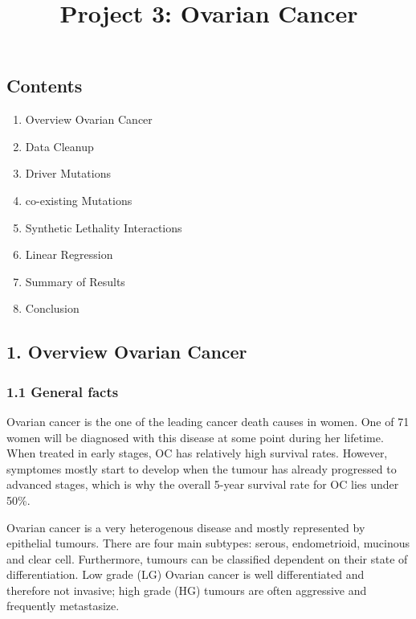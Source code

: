 \documentclass[]{article}
\title{Project 3: Ovarian Cancer}
\author{}
\date{}
\providecommand{\tightlist}{%
  \setlength{\itemsep}{0pt}\setlength{\parskip}{0pt}}
\begin{document}
\maketitle

\hypertarget{contents}{%
\subsection{Contents}\label{contents}}

\begin{enumerate}
\def\labelenumi{\arabic{enumi}.}
\tightlist
\item
  Overview Ovarian Cancer
\item
  Data Cleanup
\item
  Driver Mutations
\item
  co-existing Mutations
\item
  Synthetic Lethality Interactions
\item
  Linear Regression
\item
  Summary of Results
\item
  Conclusion
\end{enumerate}

\hypertarget{overview-ovarian-cancer}{%
\subsection{1. Overview Ovarian Cancer}\label{overview-ovarian-cancer}}

\hypertarget{general-facts}{%
\subsubsection{1.1 General facts}\label{general-facts}}

Ovarian cancer is the one of the leading cancer death causes in women.
One of 71 women will be diagnosed with this disease at some point during
her lifetime. When treated in early stages, OC has relatively high
survival rates. However, symptomes mostly start to develop when the
tumour has already progressed to advanced stages, which is why the
overall 5-year survival rate for OC lies under 50\%.

Ovarian cancer is a very heterogenous disease and mostly represented by
epithelial tumours. There are four main subtypes: serous, endometrioid,
mucinous and clear cell. Furthermore, tumours can be classified
dependent on their state of differentiation. Low grade (LG) Ovarian
cancer is well differentiated and therefore not invasive; high grade
(HG) tumours are often aggressive and frequently metastasize.
\end{document}
